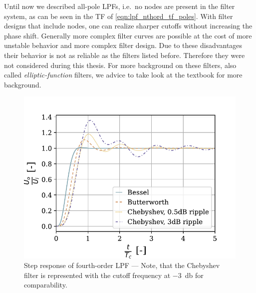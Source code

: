 Until now we described all-pole \ac{LPF}s, i.e.\ no nodes are present in the filter system, as can be seen in the \ac{TF} of \eqref{eqn:lpf_nthord_tf_poles}. With filter designs that include nodes, one can realize sharper cutoffs without increasing the phase shift. Generally more complex filter curves are possible at the cost of more unstable behavior and more complex filter design. Due to these disadvantages their behavior is not as reliable as the filters listed before. Therefore they were not considered during this thesis. For more background on these filters, also called \emph{elliptic-function} filters, we advice to take look at the textbook \cite{williams2014analog} for more background.

\begin{figure}[!htb]
  \centering
  \includegraphics[scale=0.72]{figures/electronics/lowpass/lp_filter_4ord_step}
  \caption[Step response of fourth-order \ac{LPF}]{Step response of fourth-order \ac{LPF} --- Note, that the Chebyshev filter is represented with the cutoff frequency at \SI{-3}{\decibel} for comparability.%
    \label{fig:lp_filter_4ord_step}}
\end{figure}

